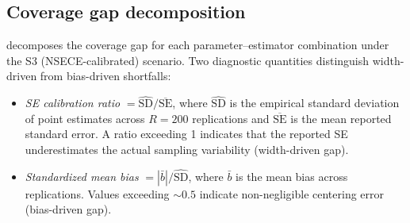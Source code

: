 
\subsection{Coverage gap decomposition}
\label{smf:decomposition}

 decomposes the coverage gap for each
parameter--estimator combination under the S3 (NSECE-calibrated) scenario.
Two diagnostic quantities distinguish width-driven from bias-driven
shortfalls:
\begin{itemize}[nosep]
  \item \emph{SE calibration ratio} $= \widehat{\mathrm{SD}} /
    \overline{\mathrm{SE}}$, where $\widehat{\mathrm{SD}}$ is the
    empirical standard deviation of point estimates across $R = 200$
    replications and $\overline{\mathrm{SE}}$ is the mean reported
    standard error.  A ratio exceeding 1 indicates that the reported SE
    underestimates the actual sampling variability (width-driven gap).
  \item \emph{Standardized mean bias} $= |\bar{b}| /
    \widehat{\mathrm{SD}}$, where $\bar{b}$ is the mean bias across
    replications.  Values exceeding $\sim 0.5$ indicate non-negligible
    centering error (bias-driven gap).
\end{itemize}

\begin{table}[htbp]
\centering
\caption{Coverage gap decomposition under the S3 (NSECE-calibrated)
  scenario.  ``Below'' and ``Above'' report the percentage of replications
  where the true value falls below or above the confidence interval,
  respectively.  SE ratio $> 1$ indicates intervals that are too narrow;
  $|\bar{b}|/\mathrm{SD} > 0.5$ indicates non-negligible point estimate
  bias.  $\star$ = sandwich structurally inapplicable (E-WS $\equiv$ E-WT).}
\label{smf:tab-decomposition}

\end{table}

